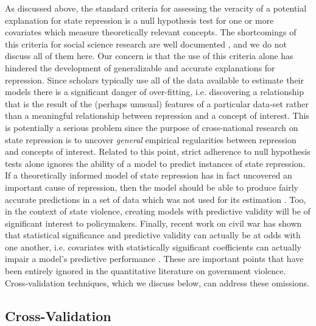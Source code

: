 \documentclass[12pt]{article}
\begin{document}
As discussed above, the standard criteria for assessing the veracity of a potential explanation for state repression is a null hypothesis test for one or more covariates which measure theoretically relevant concepts. The shortcomings of this criteria for social science research are well documented \citep[See, e.g.][]{Gill1999}, and we do not discuss all of them here. Our concern is that the use of this criteria alone has hindered the development of generalizable and accurate explanations for repression.  Since scholars typically use all of the data available to estimate their models there is a significant danger of over-fitting, i.e. discovering a relationship that is the result of the (perhaps unusual) features of a particular data-set rather than a meaningful relationship between repression and a concept of interest. This is potentially a serious problem since the purpose of cross-national research on state repression is to uncover {\em general} empirical regularities between repression and concepts of interest. Related to this point, strict adherence to null hypothesis tests alone ignores the ability of a model to predict instances of state repression. If a theoretically informed model of state repression has in fact uncovered an important cause of repression, then the model should be able to produce fairly accurate predictions in a set of data which was not used for its estimation \citep[See][]{BeckKingZeng2000,Wardetal2010}. Too, in the context of state violence, creating models with predictive validity will be of significant interest to policymakers. Finally, recent work on civil war has shown that statistical significance and predictive validity can actually be at odds with one another, i.e. covariates with statistically significant coefficients can actually impair a model's predictive performance \citep{Wardetal2010}.  These are important points that have been entirely ignored in the quantitative literature  on government violence. Cross-validation techniques, which we discuss below, can address these omissions.

\subsection{Cross-Validation}
\end{document}
